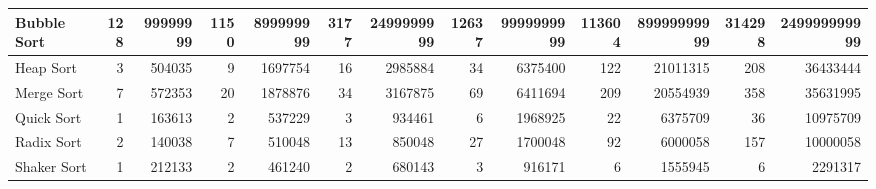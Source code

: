 \documentclass{article}
\begin{document}
\begin{table}[H]
\begin{adjustbox}{width=\columnwidth,center}
\begin{tabular}{|l|rrrrrrrrrrrr|}
Bubble Sort       & \multicolumn{1}{r|}{128}          & \multicolumn{1}{r|}{99999999}   & \multicolumn{1}{r|}{1150}         & \multicolumn{1}{r|}{899999999}  & \multicolumn{1}{r|}{3177}         & \multicolumn{1}{r|}{2499999999} & \multicolumn{1}{r|}{12637}        & \multicolumn{1}{r|}{9999999999} & \multicolumn{1}{r|}{113604}       & \multicolumn{1}{r|}{89999999999} & \multicolumn{1}{r|}{314298}       & 249999999999                    \\ \hline
Heap Sort         & \multicolumn{1}{r|}{3}            & \multicolumn{1}{r|}{504035}     & \multicolumn{1}{r|}{9}            & \multicolumn{1}{r|}{1697754}    & \multicolumn{1}{r|}{16}           & \multicolumn{1}{r|}{2985884}    & \multicolumn{1}{r|}{34}           & \multicolumn{1}{r|}{6375400}    & \multicolumn{1}{r|}{122}          & \multicolumn{1}{r|}{21011315}    & \multicolumn{1}{r|}{208}          & 36433444                        \\ \hline
Merge Sort        & \multicolumn{1}{r|}{7}            & \multicolumn{1}{r|}{572353}     & \multicolumn{1}{r|}{20}           & \multicolumn{1}{r|}{1878876}    & \multicolumn{1}{r|}{34}           & \multicolumn{1}{r|}{3167875}    & \multicolumn{1}{r|}{69}           & \multicolumn{1}{r|}{6411694}    & \multicolumn{1}{r|}{209}          & \multicolumn{1}{r|}{20554939}    & \multicolumn{1}{r|}{358}          & 35631995                        \\ \hline
Quick Sort        & \multicolumn{1}{r|}{1}            & \multicolumn{1}{r|}{163613}     & \multicolumn{1}{r|}{2}            & \multicolumn{1}{r|}{537229}     & \multicolumn{1}{r|}{3}            & \multicolumn{1}{r|}{934461}     & \multicolumn{1}{r|}{6}            & \multicolumn{1}{r|}{1968925}    & \multicolumn{1}{r|}{22}           & \multicolumn{1}{r|}{6375709}     & \multicolumn{1}{r|}{36}           & 10975709                        \\ \hline
Radix Sort        & \multicolumn{1}{r|}{2}            & \multicolumn{1}{r|}{140038}     & \multicolumn{1}{r|}{7}            & \multicolumn{1}{r|}{510048}     & \multicolumn{1}{r|}{13}           & \multicolumn{1}{r|}{850048}     & \multicolumn{1}{r|}{27}           & \multicolumn{1}{r|}{1700048}    & \multicolumn{1}{r|}{92}           & \multicolumn{1}{r|}{6000058}     & \multicolumn{1}{r|}{157}          & 10000058                        \\ \hline
Shaker Sort       & \multicolumn{1}{r|}{1}            & \multicolumn{1}{r|}{212133}     & \multicolumn{1}{r|}{2}            & \multicolumn{1}{r|}{461240}     & \multicolumn{1}{r|}{2}            & \multicolumn{1}{r|}{680143}     & \multicolumn{1}{r|}{3}            & \multicolumn{1}{r|}{916171}     & \multicolumn{1}{r|}{6}            & \multicolumn{1}{r|}{1555945}     & \multicolumn{1}{r|}{6}            & 2291317                         \\ \hline

\end{tabular}
\end{adjustbox}
\end{table}
\end{document}
